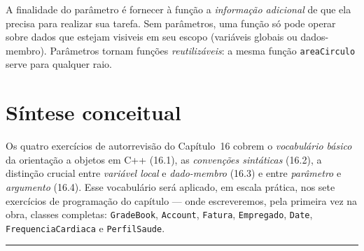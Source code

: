 \documentclass[11pt,a4paper]{article}
\begin{document}
\begin{obseng}
A finalidade do par\^ametro \'e fornecer \`a fun\c{c}\~ao a \emph{informa\c{c}\~ao adicional} de que ela precisa para realizar sua tarefa. Sem par\^ametros, uma fun\c{c}\~ao s\'o pode operar sobre dados que estejam visiveis em seu escopo (vari\'aveis globais ou dados-membro). Par\^ametros tornam fun\c{c}\~oes \emph{reutiliz\'aveis}: a mesma fun\c{c}\~ao \texttt{areaCirculo} serve para qualquer raio.
\end{obseng}

\section*{S\'intese conceitual}

Os quatro exerc\'icios de autorrevisão do Cap\'itulo~16 cobrem o \emph{vocabul\'ario b\'asico} da orienta\c{c}\~ao a objetos em C++ (16.1), as \emph{conven\c{c}\~oes sint\'aticas} (16.2), a distin\c{c}\~ao crucial entre \emph{vari\'avel local} e \emph{dado-membro} (16.3) e entre \emph{par\^ametro} e \emph{argumento} (16.4). Esse vocabul\'ario ser\'a aplicado, em escala pr\'atica, nos sete exerc\'icios de programa\c{c}\~ao do cap\'itulo --- onde escreveremos, pela primeira vez na obra, classes completas: \texttt{GradeBook}, \texttt{Account}, \texttt{Fatura}, \texttt{Empregado}, \texttt{Date}, \texttt{FrequenciaCardiaca} e \texttt{PerfilSaude}.

\vspace{1em}
\begin{center}\rule{0.5\textwidth}{0.4pt}\end{center}
\end{document}
